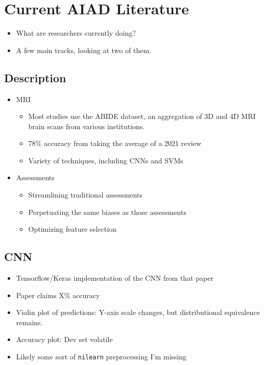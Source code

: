 \documentclass[twoside, letterpaper, twocolumn]{article}
\begin{document}
\section{Current AIAD Literature}
\begin{itemize}
    \item What are researchers currently doing?
    \item A few main tracks, looking at two of them.
\end{itemize}
\subsection{Description}
\begin{itemize}
    \item MRI
    \begin{itemize}
        \item Most studies use the ABIDE dataset, an aggregation of 3D and 4D MRI brain scans from various institutions.
        \item 78\% accuracy from taking the average of a 2021 review
        \item Variety of techniques, including CNNs and SVMs
    \end{itemize}
    \item Assessments
    \begin{itemize}
        \item Streamlining traditional assessments
        \item Perpetuating the same biases as those assessments
        \item Optimizing feature selection
    \end{itemize}
\end{itemize}
\subsection{CNN}
\begin{itemize}
    \item Tensorflow/Keras implementation of the CNN from that paper
    \item Paper claims X\% accuracy
    \item Violin plot of predictions: Y-axis scale changes, but distributional equivalence remains.
    \item Accuracy plot: Dev set volatile
    \item Likely some sort of \texttt{nilearn} preprocessing I'm missing
\end{itemize}
\end{document}
